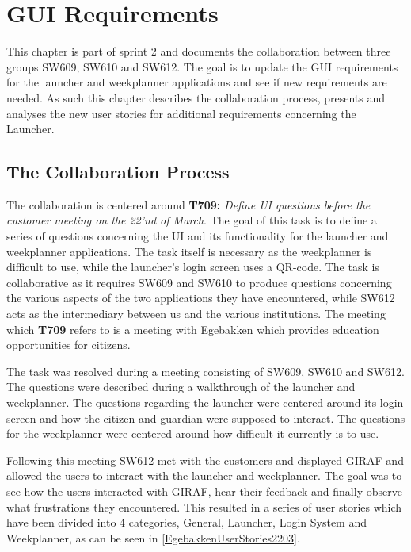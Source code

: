 \chapter{GUI Requirements}\label{sec:Colab2}
This chapter is part of sprint 2 and documents the collaboration 
between three groups SW609, SW610 and SW612. The goal is to update the GUI
requirements for the launcher and weekplanner applications and see if new
requirements are needed. As such this chapter describes the
collaboration process, presents and analyses the new user stories for
additional requirements concerning the Launcher.

\section{The Collaboration Process}
The collaboration is centered around \textbf{T709:} \textit{Define UI questions
before the customer meeting on the 22'nd of March}. The goal of this task is to
define a series of questions concerning the UI and its functionality for the
launcher and weekplanner applications. The task itself is necessary as the
weekplanner is difficult to use, while the launcher's login screen uses a
QR-code. The task is collaborative as it requires SW609 and SW610 to produce
questions concerning the various aspects of the two applications they have
encountered, while SW612 acts as the intermediary between us and the various
institutions. The meeting which \textbf{T709} refers to is a meeting with
Egebakken which provides education opportunities for citizens.\nl

The task was resolved during a meeting consisting of SW609, SW610 and SW612.
The questions were described during a walkthrough of the launcher and
weekplanner. The questions regarding the launcher were centered around its
login screen and how the citizen and guardian were supposed to interact. The
questions for the weekplanner were centered around how difficult it currently
is to use.\nl

Following this meeting SW612 met with the customers and displayed GIRAF and
allowed the users to interact with the launcher and weekplanner. The goal was to
see how the users interacted with GIRAF, hear their feedback and finally
observe what frustrations they encountered. This resulted in a series of user
stories which have been divided into 4 categories, General, Launcher, Login
System and Weekplanner, as can be seen in \autoref{EgebakkenUserStories2203}.

